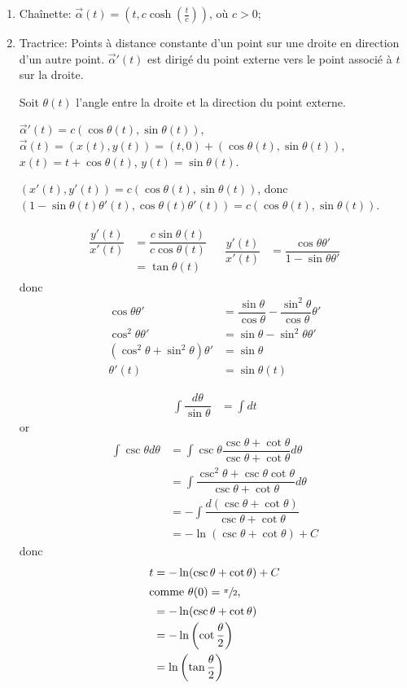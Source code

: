 \documentclass{report}
\theoremstyle{definition}
\theoremstyle{remark}
\begin{document}
	\begin{enumerate}[start=6]
		\item Cha\^inette: $\vec\alpha(t)=(t, c\cosh(\frac{t}{c}))$, o\`u $c>0$;
		\item Tractrice: Points \`a distance constante d'un point sur une droite en direction d'un autre point. $\vec\alpha'(t)$ est dirig\'e du point externe vers le point associ\'e \`a $t$ sur la droite.

		Soit $\theta(t)$ l'angle entre la droite et la direction du point externe.

		$\vec\alpha'(t) = c (\cos\theta(t), \sin\theta(t))$, $\vec\alpha(t) = (x(t),y(t)) = (t,0) + (\cos\theta(t), \sin\theta(t))$, $x(t) = t+\cos\theta(t)$, $y(t) = \sin\theta(t)$.

		$(x'(t),y'(t)) = c (\cos\theta(t), \sin\theta(t))$, donc $(1-\sin\theta(t)\theta'(t), \cos\theta(t)\theta'(t)) = c (\cos\theta(t), \sin\theta(t))$.

		\begin{align*}
			\begin{split}
				\dfrac{y'(t)}{x'(t)}&= \dfrac{c\sin\theta(t)}{c\cos\theta(t)}\\
				&= \tan\theta(t)
			\end{split}
			&
			\begin{split}
				\dfrac{y'(t)}{x'(t)}&= \dfrac{\cos\theta\theta'}{1-\sin\theta\theta'}
			\end{split}
		\end{align*}
		donc
		\begin{align*}
			\cos\theta\theta'&= \dfrac{\sin\theta}{\cos\theta} - \dfrac{\sin^2\theta}{\cos\theta}\theta'\\
			\cos^2\theta\theta'&= \sin\theta-\sin^2\theta\theta'\\
			(\cos^2\theta+\sin^2\theta)\theta'&= \sin\theta\\
			\theta'(t)&= \sin\theta(t)
		\end{align*}

		\begin{align*}
			\int \dfrac{d\theta}{\sin\theta}&= \int dt
		\end{align*}
		or
		\begin{align*}
			\int \csc\theta d\theta&= \int \csc\theta \dfrac{\csc\theta+\cot\theta}{\csc\theta+\cot\theta} d\theta\\
			&= \int \dfrac{\csc^2\theta+\csc\theta\cot\theta}{\csc\theta+\cot\theta} d\theta\\
			&= -\int \dfrac{d(\csc\theta+\cot\theta)}{\csc\theta+\cot\theta}\\
			&= -\ln(\csc\theta+\cot\theta)+C
		\end{align*}
		donc
		\begin{align*}
			t&= -\ln(\csc\theta+\cot\theta)+C\\
			\shortintertext{comme $\theta(0)=\sfrac{\pi}{2}$,}
			&= -\ln(\csc\theta+\cot\theta)\\
			&= -\ln\left(\cot\frac{\theta}{2}\right)\\
			&= \ln\left(\tan\frac{\theta}{2}\right)
		\end{align*}


\end{enumerate}
\end{document}
